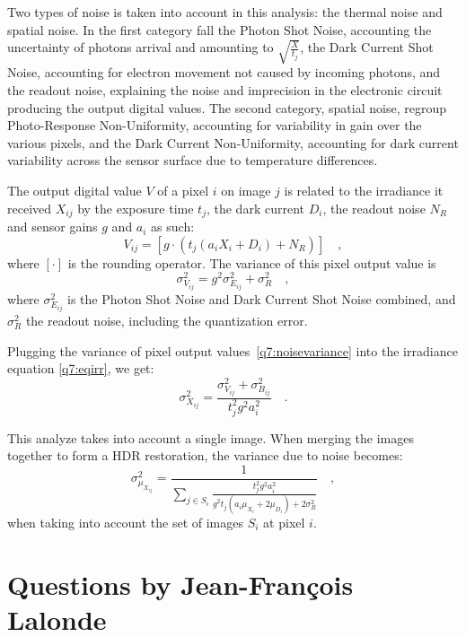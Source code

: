\documentclass{report}
\begin{document}
Two types of noise is taken into account in this analysis: the thermal noise and spatial noise. In the first category fall the Photon Shot Noise, accounting the uncertainty of photons arrival and amounting to $\sqrt{\frac{X}{t_j}}$, the Dark Current Shot Noise, accounting for electron movement not caused by incoming photons, and the readout noise, explaining the noise and imprecision in the electronic circuit producing the output digital values. The second category, spatial noise, regroup Photo-Response Non-Uniformity, accounting for variability in gain over the various pixels, and the Dark Current Non-Uniformity, accounting for dark current variability across the sensor surface due to temperature differences.

The output digital value $V$ of a pixel $i$ on image $j$ is related to the irradiance it received $X_{ij}$ by the exposure time $t_j$, the dark current $D_i$, the readout noise $N_R$ and sensor gains $g$ and $a_i$ as such:
\begin{equation}
V_{ij} = \left[ g \cdot \left( t_j \left( a_i X_i + D_i \right ) + N_R\right) \right] \quad,
\end{equation}
where $\left[ \cdot \right]$ is the rounding operator. The variance of this pixel output value is
\begin{equation}
\label{q7:noisevariance}
\sigma_{V_{ij}}^2 = g^2 \sigma_{E_{ij}}^2 + \sigma_R^2
\quad,
\end{equation}
where $\sigma_{E_{ij}}^2$ is the Photon Shot Noise and Dark Current Shot Noise combined, and $\sigma_R^2$ the readout noise, including the quantization error.

Plugging the variance of pixel output values~\eqref{q7:noisevariance} into the irradiance equation \eqref{q7:eqirr}, we get:
\begin{equation}
\sigma_{X_{ij}}^2 = \frac{\sigma_{V_{ij}}^2 + \sigma_{B_{ij}}^2}{t_j^2 g^2 a_i^2} \quad.
\end{equation}

This analyze takes into account a single image. When merging the images together to form a HDR restoration, the variance due to noise becomes:
\begin{equation}
\sigma_{\mu_{X_{ij}}}^2 = \frac{1}{\sum_{j \in S_i} \frac{t_j^2 g^2 a_i^2}{g^2 t_j \left( a_i \mu_{X_i} + 2 \mu_{D_i} \right) + 2 \sigma_R^2}} \quad,
\end{equation}
when taking into account the set of images $S_i$ at pixel $i$.

\chapter{Questions by Jean-François Lalonde}
\end{document}
